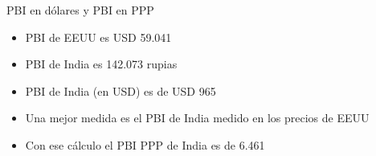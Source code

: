 \documentclass{beamer}
\begin{document}
\begin{frame}{PBI en dólares y PBI en PPP}
\begin{itemize}
    \item PBI de EEUU es USD 59.041 \vspace{1mm}
    \item PBI de India es 142.073 rupias \vspace{1mm}
    \item PBI de India (en USD) es de USD 965  \vspace{1mm}
    \item Una mejor medida es el PBI de India medido en los precios de EEUU \vspace{1mm}
    \item Con ese cálculo el PBI PPP de India es de 6.461
\end{itemize}
\end{frame}
\end{document}
